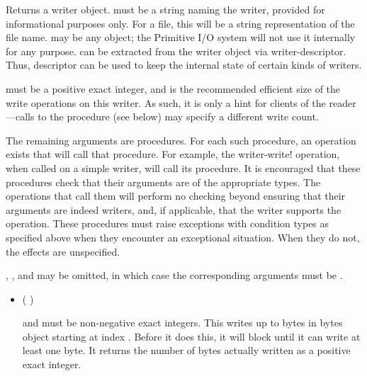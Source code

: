 \begin{entry}{%
}
   
Returns a writer object.  must be a string naming the writer,
provided for informational purposes only. For a file, this will be a
string representation of the file name.  may be any
object; the Primitive I/O system will not use it internally for any
purpose.  can be extracted from the writer object via
{\cf writer-descriptor}. Thus, descriptor can be used to keep the
internal state of certain kinds of writers.

 must be a positive exact integer, and is the
recommended efficient size of the write operations on this writer. As
such, it is only a hint for clients of the reader---calls to the
 procedure (see below) may specify a different write
count.

The remaining arguments are procedures.  For each such procedure, an
operation exists that will call that procedure.  For example, the {\cf
  writer-write!} operation, when called on a simple writer, will call
its  procedure.
It is encouraged that these procedures check that their arguments are
of the appropriate types.  The operations that call them will perform
no checking beyond ensuring that their  arguments are
indeed writers, and, if applicable, that the writer supports the operation.
These procedures must raise
exceptions with condition types as specified above when they encounter an
exceptional situation. When they do not, the effects are unspecified.

, , and  may be
omitted, in which case the corresponding arguments must be \schfalse.

\begin{itemize}
\item {\cf (   )}
   
   and  must be non-negative exact integers.
  This writes up to  bytes in bytes object 
  starting at index . Before it does this, it will block
  until it can write at least one byte. It returns the number of bytes
  actually written as a positive exact integer.
  

\end{itemize}
\end{entry}
